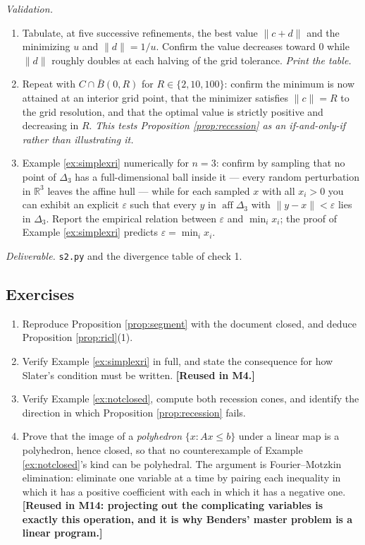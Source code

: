 \documentclass[11pt,a4paper]{article}
\theoremstyle{definition}
\theoremstyle{plain}
\theoremstyle{remark}
\newcommand{\R}{\mathbb{R}}
\newcommand{\norm}[1]{\lVert #1\rVert}
\DeclareMathOperator{\aff}{aff}
\newcommand{\Simplex}{\Delta}
\begin{document}
\emph{Validation.}
\begin{enumerate}
\item Tabulate, at five successive refinements, the best value $\norm{c+d}$ and the minimizing
$u$ and $\norm d=1/u$. Confirm the value decreases toward $0$ while $\norm{d}$ roughly doubles
at each halving of the grid tolerance. \emph{Print the table.}
\item Repeat with $C\cap\bar B(0,R)$ for $R\in\{2,10,100\}$: confirm the minimum is now attained
at an interior grid point, that the minimizer satisfies $\norm c=R$ to the grid resolution, and
that the optimal value is strictly positive and decreasing in $R$. \emph{This tests Proposition
\ref{prop:recession} as an if-and-only-if rather than illustrating it.}
\item Example \ref{ex:simplexri} numerically for $n=3$: confirm by sampling that no point of
$\Simplex_3$ has a full-dimensional ball inside it --- every random perturbation in $\R^3$
leaves the affine hull --- while for each sampled $x$ with all $x_i>0$ you can exhibit an
explicit $\varepsilon$ such that every $y$ in $\aff\Simplex_3$ with $\norm{y-x}<\varepsilon$
lies in $\Simplex_3$. Report the empirical relation between $\varepsilon$ and $\min_ix_i$;
the proof of Example \ref{ex:simplexri} predicts $\varepsilon=\min_ix_i$.
\end{enumerate}

\emph{Deliverable.} \texttt{s2.py} and the divergence table of check 1.

\subsection*{Exercises}
\begin{enumerate}[label=E2.\arabic*]
\item Reproduce Proposition \ref{prop:segment} with the document closed, and deduce
Proposition \ref{prop:ricl}(1).
\item Verify Example \ref{ex:simplexri} in full, and state the consequence for how Slater's
condition must be written. \textbf{[Reused in M4.]}
\item Verify Example \ref{ex:notclosed}, compute both recession cones, and identify the
direction in which Proposition \ref{prop:recession} fails.
\item Prove that the image of a \emph{polyhedron} $\{x:Ax\le b\}$ under a linear map is a
polyhedron, hence closed, so that no counterexample of Example \ref{ex:notclosed}'s kind can be
polyhedral. The argument is Fourier--Motzkin elimination: eliminate one variable at a time by
pairing each inequality in which it has a positive coefficient with each in which it has a
negative one. \textbf{[Reused in M14: projecting out the complicating variables is exactly this
operation, and it is why Benders' master problem is a linear program.]}
\end{enumerate}
\end{document}
